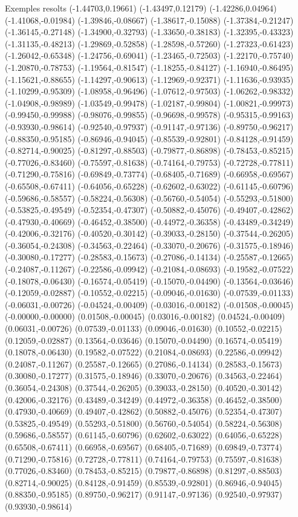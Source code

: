 \documentclass[11pt,a4paper]{article}
\begin{document}
\begin{fmex}{Exemples resolts}
(-1.44703,0.19661) (-1.43497,0.12179) (-1.42286,0.04964) (-1.41068,-0.01984) (-1.39846,-0.08667) (-1.38617,-0.15088) (-1.37384,-0.21247) (-1.36145,-0.27148) (-1.34900,-0.32793) (-1.33650,-0.38183) (-1.32395,-0.43323) (-1.31135,-0.48213) (-1.29869,-0.52858) (-1.28598,-0.57260) (-1.27323,-0.61423) (-1.26042,-0.65348) (-1.24756,-0.69041) (-1.23465,-0.72503) (-1.22170,-0.75740) (-1.20870,-0.78753) (-1.19564,-0.81547) (-1.18255,-0.84127) (-1.16940,-0.86495) (-1.15621,-0.88655) (-1.14297,-0.90613) (-1.12969,-0.92371) (-1.11636,-0.93935) (-1.10299,-0.95309) (-1.08958,-0.96496) (-1.07612,-0.97503) (-1.06262,-0.98332) (-1.04908,-0.98989) (-1.03549,-0.99478) (-1.02187,-0.99804) (-1.00821,-0.99973) (-0.99450,-0.99988) (-0.98076,-0.99855) (-0.96698,-0.99578) (-0.95315,-0.99163) (-0.93930,-0.98614) (-0.92540,-0.97937) (-0.91147,-0.97136) (-0.89750,-0.96217) (-0.88350,-0.95185) (-0.86946,-0.94045) (-0.85539,-0.92801) (-0.84128,-0.91459) (-0.82714,-0.90025) (-0.81297,-0.88503) (-0.79877,-0.86898) (-0.78453,-0.85215) (-0.77026,-0.83460) (-0.75597,-0.81638) (-0.74164,-0.79753) (-0.72728,-0.77811) (-0.71290,-0.75816) (-0.69849,-0.73774) (-0.68405,-0.71689) (-0.66958,-0.69567) (-0.65508,-0.67411) (-0.64056,-0.65228) (-0.62602,-0.63022) (-0.61145,-0.60796) (-0.59686,-0.58557) (-0.58224,-0.56308) (-0.56760,-0.54054) (-0.55293,-0.51800) (-0.53825,-0.49549) (-0.52354,-0.47307) (-0.50882,-0.45076) (-0.49407,-0.42862) (-0.47930,-0.40669) (-0.46452,-0.38500) (-0.44972,-0.36358) (-0.43489,-0.34249) (-0.42006,-0.32176) (-0.40520,-0.30142) (-0.39033,-0.28150) (-0.37544,-0.26205) (-0.36054,-0.24308) (-0.34563,-0.22464) (-0.33070,-0.20676) (-0.31575,-0.18946) (-0.30080,-0.17277) (-0.28583,-0.15673) (-0.27086,-0.14134) (-0.25587,-0.12665) (-0.24087,-0.11267) (-0.22586,-0.09942) (-0.21084,-0.08693) (-0.19582,-0.07522) (-0.18078,-0.06430) (-0.16574,-0.05419) (-0.15070,-0.04490) (-0.13564,-0.03646) (-0.12059,-0.02887) (-0.10552,-0.02215) (-0.09046,-0.01630) (-0.07539,-0.01133) (-0.06031,-0.00726) (-0.04524,-0.00409) (-0.03016,-0.00182) (-0.01508,-0.00045) (-0.00000,-0.00000) (0.01508,-0.00045) (0.03016,-0.00182) (0.04524,-0.00409) (0.06031,-0.00726) (0.07539,-0.01133) (0.09046,-0.01630) (0.10552,-0.02215) (0.12059,-0.02887) (0.13564,-0.03646) (0.15070,-0.04490) (0.16574,-0.05419) (0.18078,-0.06430) (0.19582,-0.07522) (0.21084,-0.08693) (0.22586,-0.09942) (0.24087,-0.11267) (0.25587,-0.12665) (0.27086,-0.14134) (0.28583,-0.15673) (0.30080,-0.17277) (0.31575,-0.18946) (0.33070,-0.20676) (0.34563,-0.22464) (0.36054,-0.24308) (0.37544,-0.26205) (0.39033,-0.28150) (0.40520,-0.30142) (0.42006,-0.32176) (0.43489,-0.34249) (0.44972,-0.36358) (0.46452,-0.38500) (0.47930,-0.40669) (0.49407,-0.42862) (0.50882,-0.45076) (0.52354,-0.47307) (0.53825,-0.49549) (0.55293,-0.51800) (0.56760,-0.54054) (0.58224,-0.56308) (0.59686,-0.58557) (0.61145,-0.60796) (0.62602,-0.63022) (0.64056,-0.65228) (0.65508,-0.67411) (0.66958,-0.69567) (0.68405,-0.71689) (0.69849,-0.73774) (0.71290,-0.75816) (0.72728,-0.77811) (0.74164,-0.79753) (0.75597,-0.81638) (0.77026,-0.83460) (0.78453,-0.85215) (0.79877,-0.86898) (0.81297,-0.88503) (0.82714,-0.90025) (0.84128,-0.91459) (0.85539,-0.92801) (0.86946,-0.94045) (0.88350,-0.95185) (0.89750,-0.96217) (0.91147,-0.97136) (0.92540,-0.97937) (0.93930,-0.98614) 
\end{fmex}
\end{document}
